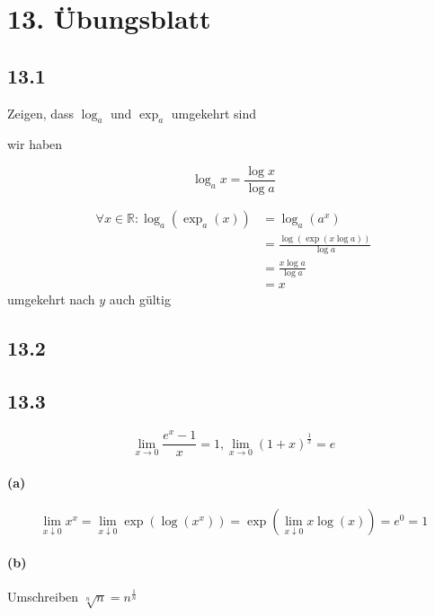 \section{13. Übungsblatt}

\subsection{13.1}

Zeigen, dass $\log_a$ und $\exp_a$ umgekehrt sind

wir haben

\begin{equation*}
\log_a x=\frac{\log x}{\log a}
\end{equation*}

\begin{align*}
\forall x\in\mathbb{R}:\log_a(\exp_a(x))&=\log_a(a^x)\\
&=\frac{\log(\exp(x\log a))}{\log a}\\
&=\frac{x\log a}{\log a}\\
&=x
\end{align*}
umgekehrt nach $y$ auch gültig

\subsection{13.2}

\subsection{13.3}

\begin{equation*}
\lim_{x\rightarrow0}\frac{e^x-1}{x}=1,\lim_{x\rightarrow0}(1+x)^{\frac{1}{x}}=e
\end{equation*}

\paragraph{(a)}

\begin{equation*}
\lim_{x\downarrow0}x^x=\lim_{x\downarrow0}\exp(\log(x^x))=\exp(\lim_{x\downarrow0}x\log(x))=e^0=1
\end{equation*}

\paragraph{(b)}

Umschreiben $\sqrt[n]{n}=n^\frac{1}{n}$

